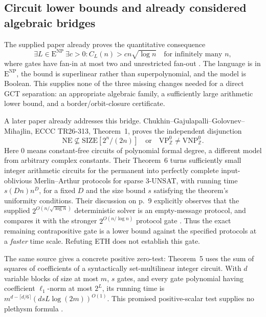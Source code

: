 \documentclass[11pt,a4paper]{article}
\begin{document}
\subsection{Circuit lower bounds and already considered algebraic bridges}

The supplied paper already proves the quantitative consequence
\[
 \exists L\in\mathrm E^{\mathrm{NP}}\ \exists c>0:
 C_L(n)>c n\sqrt{\log n}\quad\text{for infinitely many }n,
\]
where gates have fan-in at most two and unrestricted fan-out
\cite[Corollary~1.4; Appendix~C.1; \texttt{quantitative-circuits.tex}]{COAI26}.
The language is in \(\mathrm E^{\mathrm{NP}}\), the bound is
superlinear rather than superpolynomial, and the model is Boolean.
This supplies none of the three missing changes needed for a direct
GCT separation: an appropriate algebraic family, a sufficiently large
arithmetic lower bound, and a border/orbit-closure certificate.

A later paper already addresses this bridge.  Chukhin--Gajulapalli--Golovnev--Mihajlin,
ECCC TR26-313, Theorem~1, proves the independent disjunction
\[
 \mathrm{NE}\not\subseteq\mathrm{SIZE}[2^n/(2n)]
 \quad\text{or}\quad
 \mathrm{VP}^{0}_{\mathbb Z}\ne\mathrm{VNP}^{0}_{\mathbb Z}.
\]
Here \(0\) means constant-free circuits of polynomial formal degree,
a different model from arbitrary complex constants.  Their Theorem~6
turns sufficiently small integer arithmetic circuits for the permanent
into perfectly complete input-oblivious Merlin--Arthur protocols for
sparse 3-UNSAT, with running time \(s(Dn)n^D\), for a fixed \(D\)
and the size bound \(s\) satisfying the theorem's uniformity conditions.
Their discussion on p.~9 explicitly observes that the supplied
\(2^{O(n/\sqrt{\log n})}\) deterministic solver is an empty-message
protocol, and compares it with the stronger
\(2^{O(n/\log n)}\) protocol gate \cite[Theorems~1 and~6; pp.~8--9]{CCGGM26}.
Thus the exact remaining contrapositive gate is a lower bound against
the specified protocols at a \emph{faster} time scale.  Refuting ETH
does not establish this gate.

The same source gives a concrete positive zero-test: Theorem~5 uses
the sum of squares of coefficients of a syntactically set-multilinear
integer circuit.  With \(d\) variable blocks of size at most \(m\),
\(s\) gates, and every gate polynomial having coefficient
\(\ell_1\)-norm at most \(2^L\), its running time is
\(m^{d-\lceil d/6\rceil}(dsL\log(2m))^{O(1)}\).
This promised positive-scalar test supplies no plethysm formula
\cite[Theorem~5, \S8.2]{CCGGM26}.
\end{document}
